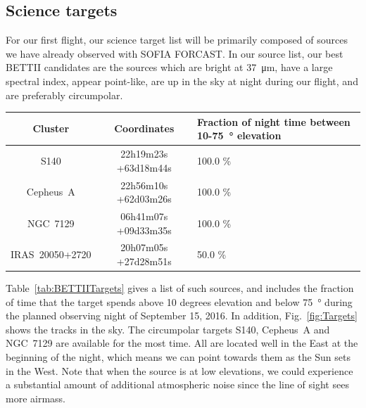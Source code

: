 \subsection{Science targets}
For our first flight, our science target list will be primarily composed of sources we have already observed with SOFIA FORCAST. In our source list, our best BETTII candidates are the sources which are bright at \SI{37}{\um}, have a large spectral index, appear point-like, are up in the sky at night during our flight, and are preferably circumpolar. 

\begin{table}[ht!]
\begin{center}
\caption{BETTII Targets}
\label{tab:BETTIITargets}
\vspace{-0.5cm}
\begin{longtable}{ccP{4cm}}
\toprule										
	Cluster	&	Coordinates	&	Fraction of night time between 10-\SI{75}{\degree} elevation		\\	
\midrule										
	S140	&	 22h19m23s +63d18m44s 	&	100.0	\%	\\		
	Cepheus~A	&	 22h56m10s +62d03m26s 	&	100.0	\%	\\	
	NGC~7129	&	 06h41m07s +09d33m35s 	&	100.0	\%	\\
	IRAS~20050+2720	&	 20h07m05s +27d28m51s 	&	50.0	\%	\\
\bottomrule										
\end{longtable}
\end{center}
\end{table}			

Table~\ref{tab:BETTIITargets} gives a list of such sources, and includes the fraction of time that the target spends above 10 degrees elevation and below \SI{75}{\degree} during the planned observing night of September 15, 2016. In addition, Fig.~\ref{fig:Targets} shows the tracks in the sky. The circumpolar targets S140, Cepheus~A and NGC~7129 are available for the most time. All are located well in the East at the beginning of the night, which means we can point towards them as the Sun sets in the West. Note that when the source is at low elevations, we could experience a substantial amount of additional atmospheric noise since the line of sight sees more airmass.

